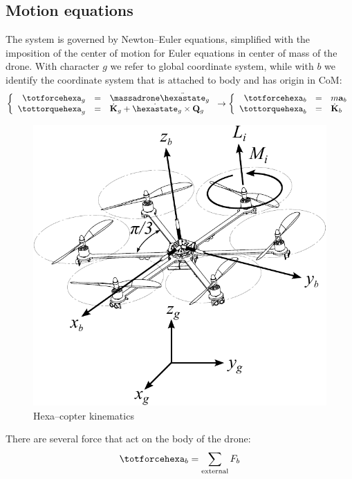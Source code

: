 \subsection{Motion equations}
The system is governed by Newton--Euler equations, simplified with the imposition of the center of motion for Euler equations in center of mass of the drone. With character $g$ we refer to global coordinate system, while with $b$ we identify the coordinate system that is attached to body and has origin in CoM:
\begin{equation}
\left\{
\begin{array}{rcl}
\totforcehexa_g & = & \massadrone \ddot{\hexastate}_g \\
\tottorquehexa_g & = & \dot{\mathbf{K}}_g + \dot{\hexastate}_g \times \mathbf{Q}_g%
\end{array}
\right.  \rightarrow  \left\{
\begin{array}{rcl}
\totforcehexa_b & = & m \mathbf{a}_b \\
\tottorquehexa_b & = & \dot{\mathbf{K}}_b%
\end{array}
\right.
\end{equation}
\begin{figure}[h]
	\centering
	\includegraphics[scale=0.55]{ch3/img/hexacopter_kine.pdf}
	\caption{Hexa--copter kinematics}
	\forceversofloat
\end{figure}
There are several force that act on the body of the drone:
\begin{equation}
\totforcehexa_b = \sum\limits_{\mathrm{external}} F_b
\end{equation}

